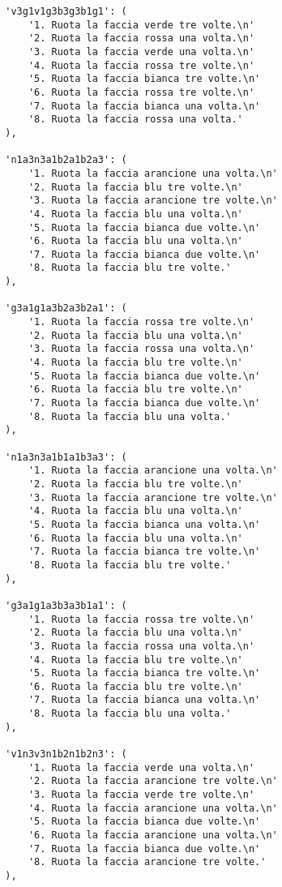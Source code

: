 \begin{lstlisting}
        'v3g1v1g3b3g3b1g1': (
            '1. Ruota la faccia verde tre volte.\n'
            '2. Ruota la faccia rossa una volta.\n'
            '3. Ruota la faccia verde una volta.\n'
            '4. Ruota la faccia rossa tre volte.\n'
            '5. Ruota la faccia bianca tre volte.\n'
            '6. Ruota la faccia rossa tre volte.\n'
            '7. Ruota la faccia bianca una volta.\n'
            '8. Ruota la faccia rossa una volta.'
        ),

        'n1a3n3a1b2a1b2a3': (
            '1. Ruota la faccia arancione una volta.\n'
            '2. Ruota la faccia blu tre volte.\n'
            '3. Ruota la faccia arancione tre volte.\n'
            '4. Ruota la faccia blu una volta.\n'
            '5. Ruota la faccia bianca due volte.\n'
            '6. Ruota la faccia blu una volta.\n'
            '7. Ruota la faccia bianca due volte.\n'
            '8. Ruota la faccia blu tre volte.'
        ),

        'g3a1g1a3b2a3b2a1': (
            '1. Ruota la faccia rossa tre volte.\n'
            '2. Ruota la faccia blu una volta.\n'
            '3. Ruota la faccia rossa una volta.\n'
            '4. Ruota la faccia blu tre volte.\n'
            '5. Ruota la faccia bianca due volte.\n'
            '6. Ruota la faccia blu tre volte.\n'
            '7. Ruota la faccia bianca due volte.\n'
            '8. Ruota la faccia blu una volta.'
        ),

        'n1a3n3a1b1a1b3a3': (
            '1. Ruota la faccia arancione una volta.\n'
            '2. Ruota la faccia blu tre volte.\n'
            '3. Ruota la faccia arancione tre volte.\n'
            '4. Ruota la faccia blu una volta.\n'
            '5. Ruota la faccia bianca una volta.\n'
            '6. Ruota la faccia blu una volta.\n'
            '7. Ruota la faccia bianca tre volte.\n'
            '8. Ruota la faccia blu tre volte.'
        ),

        'g3a1g1a3b3a3b1a1': (
            '1. Ruota la faccia rossa tre volte.\n'
            '2. Ruota la faccia blu una volta.\n'
            '3. Ruota la faccia rossa una volta.\n'
            '4. Ruota la faccia blu tre volte.\n'
            '5. Ruota la faccia bianca tre volte.\n'
            '6. Ruota la faccia blu tre volte.\n'
            '7. Ruota la faccia bianca una volta.\n'
            '8. Ruota la faccia blu una volta.'
        ),

        'v1n3v3n1b2n1b2n3': (
            '1. Ruota la faccia verde una volta.\n'
            '2. Ruota la faccia arancione tre volte.\n'
            '3. Ruota la faccia verde tre volte.\n'
            '4. Ruota la faccia arancione una volta.\n'
            '5. Ruota la faccia bianca due volte.\n'
            '6. Ruota la faccia arancione una volta.\n'
            '7. Ruota la faccia bianca due volte.\n'
            '8. Ruota la faccia arancione tre volte.'
        ),


\end{lstlisting}
